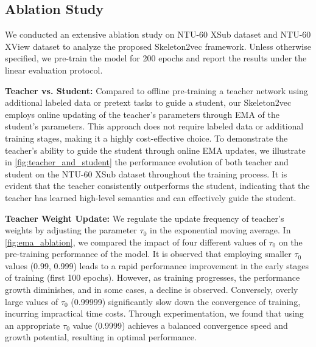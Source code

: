 \subsection{Ablation Study}
We conducted an extensive ablation study on NTU-60 XSub dataset and NTU-60 XView dataset to analyze the proposed
Skeleton2vec framework. Unless otherwise specified, we pre-train the model for 200
epochs and report the results under the linear evaluation protocol.

\noindent \textbf{Teacher vs. Student:}
Compared to offline pre-training a teacher network using additional labeled data or
pretext tasks to guide a student, our Skeleton2vec employs online updating of the
teacher's parameters through EMA of the student's parameters.
This approach does not require labeled data or additional training stages,
making it a highly cost-effective choice.
To demonstrate the teacher's ability to guide the student through online EMA updates,
we illustrate in \cref{fig:teacher_and_student} the performance evolution of both teacher and student on the
NTU-60 XSub dataset throughout the training process.
It is evident that the teacher consistently outperforms the student,
indicating that the teacher has learned high-level semantics and can effectively guide the student.

\noindent \textbf{Teacher Weight Update:}
We regulate the update frequency of teacher's weights by adjusting the parameter
$\tau_{0}$ in the exponential moving average. In \cref{fig:ema_ablation}, we compared the
impact of four different values of $\tau_{0}$ on the pre-training performance of the model.
It is observed that employing smaller $\tau_{0}$ values (0.99, 0.999) leads to a rapid
performance improvement in the early stages of training (first 100 epochs). However,
as training progresses, the performance growth diminishes, and in some cases,
a decline is observed. Conversely, overly large values of $\tau_{0}$ (0.99999) significantly
slow down the convergence of training, incurring impractical time costs.
Through experimentation, we found that using an appropriate $\tau_{0}$ value (0.9999)
achieves a balanced convergence speed and growth potential,
resulting in optimal performance.

